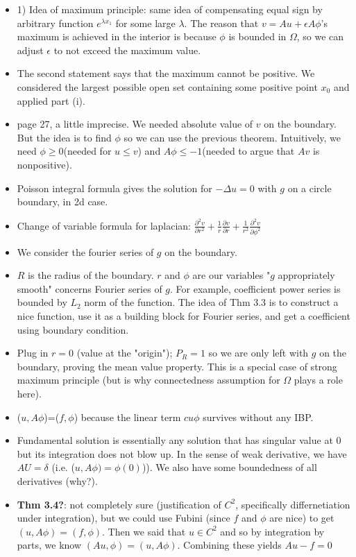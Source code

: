 \documentclass{article}
\theoremstyle{remark}
\begin{document}
\begin{itemize}
        \item 1) Idea of maximum principle: same idea of compensating equal sign by arbitrary function $e^{\lambda x_1}$ for some large $\lambda$. The reason that $v=Au+\epsilon A\phi$'s maximum is achieved in the interior is because $\phi$ is bounded in $\Omega$, so we can adjust $\epsilon$ to not exceed the maximum value. 
        \item The second statement says that the maximum cannot be positive. We considered the largest possible open set containing some positive point $x_0$ and applied part (i).
    \item page 27, a little imprecise. We needed absolute value of $v$ on the boundary. But the idea is to find $\phi$ so we can use the previous theorem. Intuitively, we need $\phi\geq 0$(needed for $u\leq v$) and $A\phi\leq -1$(needed to argue that $Av$ is nonpositive).
    \item Poisson integral formula gives the solution for $-\Delta u=0$ with $g$ on a circle boundary, in 2d case.
    \item Change of variable formula for laplacian: $\frac{\partial^2 v}{\partial r^2}+\frac 1r\frac{\partial v}{\partial r}+\frac 1{r^2}\frac{\partial^2 v}{\partial \phi^2}$
    \item We consider the fourier series of $g$ on the boundary.
    \item $R$ is the radius of the boundary. $r$ and $\phi$ are our variables "$g$ appropriately smooth" concerns Fourier series of $g$. For example, coefficient power series is bounded by $L_2$ norm of the function. The idea of Thm 3.3 is to construct a nice function, use it as a building block for Fourier series, and get a coefficient using boundary condition.
    \item Plug in $r=0$ (value at the "origin"); $P_R=1$ so we are only left with $g$ on the boundary, proving the mean value property. This is a special case of strong maximum principle (but is why connectedness assumption for $\Omega$ plays a role here).
    \item ($u, A\phi$)=($f,\phi$) because the linear term $cu\phi$ survives without any IBP. 
    \item Fundamental solution is essentially any solution that has singular value at $0$ but its integration does not blow up. In the sense of weak derivative, we have $AU=\delta$ (i.e. ($u,A\phi)=\phi (0)$)). We also have some boundedness of all derivatives (why?).
    \item \textbf{Thm 3.4?}: not completely sure (justification of $C^2$, specifically differnetiation under integration), but we could use Fubini (since $f$ and $\phi$ are nice) to get $(u,A\phi)=(f,\phi)$. Then we said that $u\in C^2$ and so by integration by parts, we know $(Au,\phi)=(u,A\phi)$. Combining these yields $Au-f=0$

\end{itemize}
\end{document}

